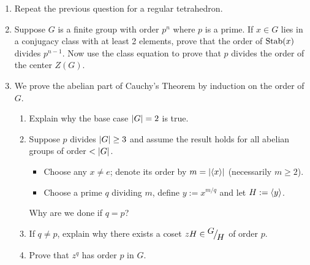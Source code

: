 \begin{exercises}{}{}
\begin{enumerate}
	\item Repeat the previous question for a regular tetrahedron.
	
	
	
	\item Suppose $G$ is a finite group with order $p^n$ where $p$ is a prime. If $x\in G$ lies in a conjugacy class with at least 2 elements, prove that the order of $\operatorname{Stab}(x)$ divides $p^{n-1}$. Now use the class equation to prove that $p$ divides the order of the center $Z(G)$.
% 	

	
	\item We prove the abelian part of Cauchy's Theorem by induction on the order of $G$.
	\begin{enumerate}
	  \item Explain why the base case $\left| G\right|=2$ is true.
	  \item Suppose $p$ divides $\left| G\right|\ge 3$ and assume the result holds for all abelian groups of order $<\left| G\right|$.
	  \begin{itemize}
			\item Choose any $x\neq e$; denote its order by $m=\left| \left\langle x\right\rangle\right|$ (necessarily $m\ge 2$).
			\item Choose a prime $q$ dividing $m$, define $y:=x^{m/q}$ and let $H:=\left\langle y\right\rangle$.
		\end{itemize}
		Why are we done if $q=p$?
	  \item If $q\neq p$, explain why there exists a coset $zH\in {}^{\textstyle {G}}\!\big/_{\textstyle \!{H}}$ of order $p$.
	  \item Prove that $z^q$ has order $p$ in $G$.
	\end{enumerate}
	
	
	

\end{enumerate}
\end{exercises}
